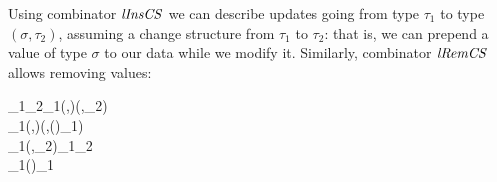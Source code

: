 Using combinator \ensuremath{\Varid{lInsCS}} we can describe updates going from type \ensuremath{\tau_{1}} to type \ensuremath{(\sigma,\tau_{2})},
assuming a change structure from \ensuremath{\tau_{1}} to \ensuremath{\tau_{2}}:
that is, we can prepend a value of type \ensuremath{\sigma} to our data while we modify it.
Similarly, combinator \ensuremath{\Varid{lRemCS}} allows removing values:
\begin{hscode}\SaveRestoreHook
{}%
%
\>[B]{}\mathrel{:\mkern-1mu:}\;_{1}\;\;_{2}\to {}\;_{1}\;(,)\;(,_{2}){}\<[E]%
\\
\>[B]{}\;\mathrel{=}\mathrel{\$}\lambda {}_{1}\;(,)\to (,(\myboxplus)\;\;_{1}\;){}\<[E]%
\\[\blanklineskip]%
\>[B]{}\mathrel{:\mkern-1mu:}\;_{1}\;\;(,_{2})\to {}\;_{1}\;\;_{2}{}\<[E]%
\\
\>[B]{}\;\mathrel{=}\mathrel{\$}\lambda {}_{1}\;\to {}\mathrel{\$}(\myboxplus)\;\;_{1}\;\<[E]%
\ColumnHook
\end{hscode}\resethooks

